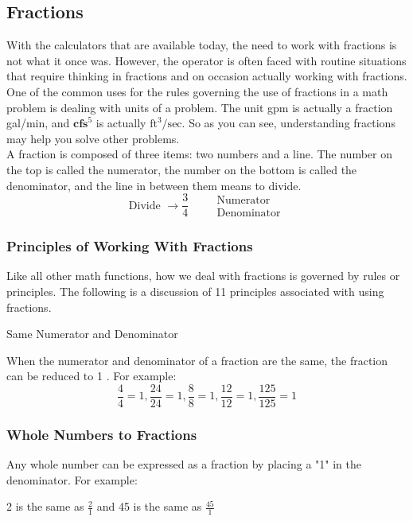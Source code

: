 \subsection{Fractions}

With the calculators that are available today, the need to work with fractions is not what it once was. However, the operator is often faced with routine situations that require thinking in fractions and on occasion actually working with fractions. One of the common uses for the rules governing the use of fractions in a math problem is dealing with units of a problem. The unit gpm is actually a fraction gal/min, and $\mathbf{c f s}^{5}$ is actually $\mathrm{ft}^{3} / \mathrm{sec}$. So as you can see, understanding fractions may help you solve other problems.\\

A fraction is composed of three items: two numbers and a line. The number on the top is called the numerator, the number on the bottom is called the denominator, and the line in between them means to divide.\\
$$
\text { Divide } \longrightarrow \frac{3}{4} \quad \begin{aligned}
&\text { Numerator } \\
&\text { Denominator }
\end{aligned}
$$

\subsubsection{Principles of Working With Fractions}
Like all other math functions, how we deal with fractions is governed by rules or principles. The following is a discussion of 11 principles associated with using fractions.

Same Numerator and Denominator

When the numerator and denominator of a fraction are the same, the fraction can be reduced to 1 . For example:
$$
\frac{4}{4}=1, \frac{24}{24}=1, \frac{8}{8}=1, \frac{12}{12}=1, \frac{125}{125}=1
$$

\subsubsection{Whole Numbers to Fractions}
Any whole number can be expressed as a fraction by placing a "1" in the denominator. For example:

2 is the same as $\frac{2}{1}$ and 45 is the same as $\frac{45}{1}$

